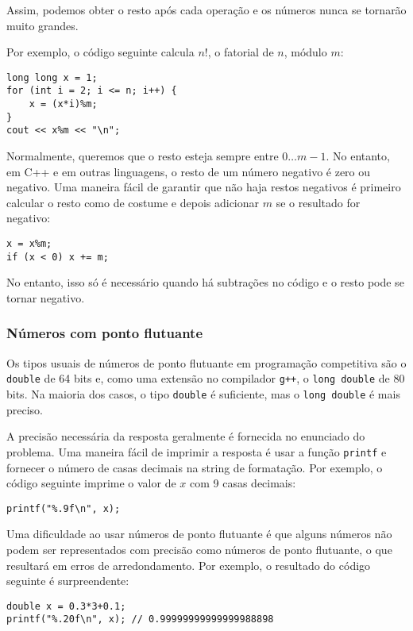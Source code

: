 Assim, podemos obter o resto após cada operação e os números nunca se tornarão muito grandes.

Por exemplo, o código seguinte calcula $n!$, 
o fatorial de $n$, módulo $m$:
\begin{lstlisting}
long long x = 1;
for (int i = 2; i <= n; i++) {
    x = (x*i)%m;
}
cout << x%m << "\n";
\end{lstlisting}

Normalmente, queremos que o resto esteja sempre entre $0\ldots m-1$.
No entanto, em C++ e em outras linguagens, o resto de um número negativo é zero ou negativo.
Uma maneira fácil de garantir que não haja restos negativos é primeiro calcular o resto como de costume e depois adicionar $m$ se o resultado for negativo:
\begin{lstlisting}
x = x%m;
if (x < 0) x += m;
\end{lstlisting}
No entanto, isso só é necessário quando há subtrações no código e o resto pode se tornar negativo.

\subsubsection{Números com ponto flutuante}


Os tipos usuais de números de ponto flutuante em programação competitiva são o \texttt{double} de 64 bits e, como uma extensão no compilador \texttt{g++}, o \texttt{long double} de 80 bits. Na maioria dos casos, o tipo \texttt{double} é suficiente, mas o \texttt{long double} é mais preciso.

A precisão necessária da resposta geralmente é fornecida no enunciado do problema. Uma maneira fácil de imprimir a resposta é usar a função \texttt{printf} e fornecer o número de casas decimais na string de formatação. Por exemplo, o código seguinte imprime o valor de $x$ com 9 casas decimais:

\begin{lstlisting}
printf("%.9f\n", x);
\end{lstlisting}

Uma dificuldade ao usar números de ponto flutuante é que alguns números não podem ser representados com precisão como números de ponto flutuante, o que resultará em erros de arredondamento. Por exemplo, o resultado do código seguinte é surpreendente:

\begin{lstlisting}
double x = 0.3*3+0.1;
printf("%.20f\n", x); // 0.99999999999999988898
\end{lstlisting}

